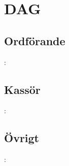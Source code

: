 \section{DAG}
\subsection{Ordförande}
\begin{frame}{\secname: \subsecname}

\end{frame}

\subsection{Kassör}
\begin{frame}{\secname: \subsecname}
\end{frame}

\subsection{Övrigt}
\begin{frame}{\secname: \subsecname}
\end{frame}